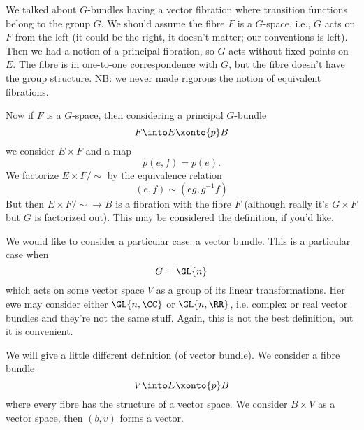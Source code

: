 We talked about $G$-bundles having a vector fibration where
transition functions belong to the group $G$. We should assume
the fibre $F$ is a $G$-space, i.e., $G$ acts on $F$ from the left
(it could be the right, it doesn't matter; our conventions is
left). Then we had a notion of a principal fibration, so $G$ acts
without fixed points on $E$. The fibre is in one-to-one
correspondence with $G$, but the fibre doesn't have the group
structure. NB: we never made rigorous the notion of equivalent fibrations.

Now if $F$ is a $G$-space, then considering a principal
$G$-bundle
\begin{equation}
F\into E \xonto{p} B
\end{equation}
we consider $E\times F$ and a map
\begin{equation}
\widetilde{p}(e,f)=p(e).
\end{equation}
We factorize $E\times F/\sim$ by the equivalence relation
\begin{equation}
(e,f)\sim (eg,g^{-1}f)
\end{equation}
But then $E\times F/\sim\to B$ is a fibration with the fibre $F$
(although really it's $G\times F$ but $G$ is factorized
out). This may be considered the definition, if you'd like.

We would like to consider a particular case: a vector
bundle. This is a particular case when
\begin{equation}
G=\GL{n}
\end{equation}
which acts on some vector space $V$ as a group of its linear
transformations. Her ewe may consider either $\GL{n,\CC}$ or
$\GL{n,\RR}$, i.e. complex or real vector bundles and they're not
the same stuff. Again, this is not the best definition, but it is
convenient.

We will give a little different definition (of vector bundle). We
consider a fibre bundle
\begin{equation}
V\into E\xonto{p}B
\end{equation}
where every fibre has the structure of a vector space. We
consider $B\times V$ as a vector space, then $(b,v)$ forms a
vector. 

